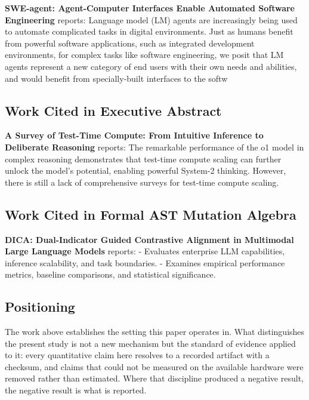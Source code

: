 \documentclass{article}
\begin{document}
\textbf{SWE-agent: Agent-Computer Interfaces Enable Automated Software Engineering} \cite{crossref_10_48550_arxiv_2405_15793} reports: Language model (LM) agents are increasingly being used to automate complicated tasks in digital environments. Just as humans benefit from powerful software applications, such as integrated development environments, for complex tasks like software engineering, we posit that LM agents represent a new category of end users with their own needs and abilities, and would benefit from specially-built interfaces to the softw


\subsection{Work Cited in Executive Abstract}


\textbf{A Survey of Test-Time Compute: From Intuitive Inference to Deliberate Reasoning} \cite{arxiv_2501_02497} reports: The remarkable performance of the o1 model in complex reasoning demonstrates that test-time compute scaling can further unlock the model's potential, enabling powerful System-2 thinking. However, there is still a lack of comprehensive surveys for test-time compute scaling.


\subsection{Work Cited in Formal AST Mutation Algebra}


\textbf{DICA: Dual-Indicator Guided Contrastive Alignment in Multimodal Large Language Models} \cite{crossref_10_18653_v1_2026_findings_acl_1933} reports: - Evaluates enterprise LLM capabilities, inference scalability, and task boundaries. - Examines empirical performance metrics, baseline comparisons, and statistical significance.


\subsection{Positioning}


The work above establishes the setting this paper operates in. What distinguishes the present study is not a new mechanism but the standard of evidence applied to it: every quantitative claim here resolves to a recorded artifact with a checksum, and claims that could not be measured on the available hardware were removed rather than estimated. Where that discipline produced a negative result, the negative result is what is reported.
\end{document}
